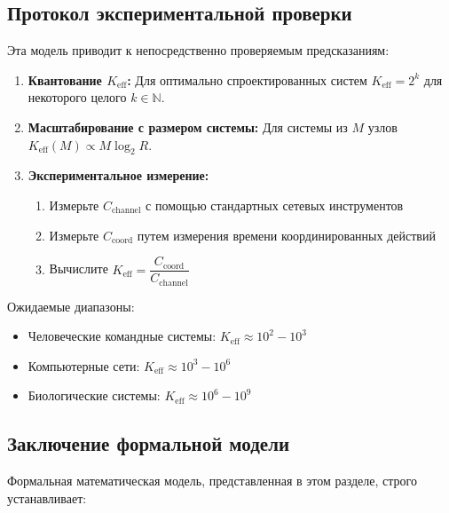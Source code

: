 \documentclass[11pt,a4paper]{article}
\begin{document}
	\subsection{Протокол экспериментальной проверки}
	
	Эта модель приводит к непосредственно проверяемым предсказаниям:
	
	\begin{enumerate}
		\item \textbf{Квантование $K_{\mathrm{eff}}$:} Для оптимально спроектированных систем $K_{\mathrm{eff}} = 2^k$ для некоторого целого $k \in \mathbb{N}$.
		
		\item \textbf{Масштабирование с размером системы:} Для системы из $M$ узлов $K_{\mathrm{eff}}(M) \propto M \log_2 R$.
		
		\item \textbf{Экспериментальное измерение:} 
		\begin{enumerate}
			\item Измерьте $C_{\text{channel}}$ с помощью стандартных сетевых инструментов
			\item Измерьте $C_{\text{coord}}$ путем измерения времени координированных действий
			\item Вычислите $K_{\mathrm{eff}} = \dfrac{C_{\text{coord}}}{C_{\text{channel}}}$
		\end{enumerate}
	\end{enumerate}
	
	Ожидаемые диапазоны:
	\begin{itemize}
		\item Человеческие командные системы: $K_{\mathrm{eff}} \approx 10^2 - 10^3$
		\item Компьютерные сети: $K_{\mathrm{eff}} \approx 10^3 - 10^6$
		\item Биологические системы: $K_{\mathrm{eff}} \approx 10^6 - 10^9$
	\end{itemize}
	
	\subsection{Заключение формальной модели}
	
	Формальная математическая модель, представленная в этом разделе, строго устанавливает:
	
\end{document}
